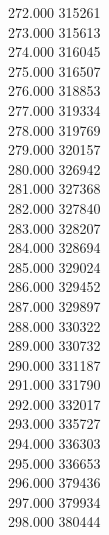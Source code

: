 { 272.000	315261 \\
 273.000	315613 \\
 274.000	316045 \\
 275.000	316507 \\
 276.000	318853 \\
 277.000	319334 \\
 278.000	319769 \\
 279.000	320157 \\
 280.000	326942 \\
 281.000	327368 \\
 282.000	327840 \\
 283.000	328207 \\
 284.000	328694 \\
 285.000	329024 \\
 286.000	329452 \\
 287.000	329897 \\
 288.000	330322 \\
 289.000	330732 \\
 290.000	331187 \\
 291.000	331790 \\
 292.000	332017 \\
 293.000	335727 \\
 294.000	336303 \\
 295.000	336653 \\
 296.000	379436 \\
 297.000	379934 \\
 298.000	380444 \\
}
